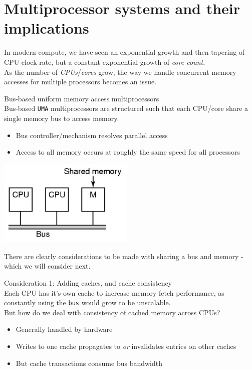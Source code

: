 \documentclass[journal, letterpaper]{IEEEtran}
\begin{document}
\section{Multiprocessor systems and their implications} 
In modern compute, we have seen an exponential growth and then tapering of CPU clock-rate, but a constant exponential growth of \textit{core count}.
\newline \\
As the number of \textit{CPUs}/\textit{cores} grow, the way we handle concurrent memory accesses for multiple processors becomes an issue.
\begin{theory}{Bus-based uniform memory access multiprocessors} \\
    Bus-based \verb|UMA| multiprocessors are structured such that each CPU/core share a single memory bus to access memory.
    \begin{itemize}
        \item Bus controller/mechanism resolves parallel access
        \item Access to all memory occurs at roughly the same speed for all processors
    \end{itemize}
    \begin{center}
        \includegraphics[width=6.5cm]{./photos/uma.png}
    \end{center}
    There are clearly considerations to be made with sharing a bus and memory - which we will consider next.
\end{theory}
\begin{aside}{Consideration 1: Adding caches, and cache consistency} \\ 
    Each CPU has it's own cache to increase memory fetch performance, as constantly using the \verb|bus| would grow to be unscalable.
    \newline \\ 
    But how do we deal with consistency of cached memory across CPUs?
    \begin{itemize}
        \item Generally handled by hardware
        \item Writes to one cache propagates to \textit{or} invalidates entries on other caches
        \item But cache transactions consume bus bandwidth
    \end{itemize}
\end{aside}
\end{document}
